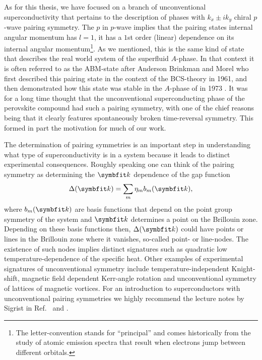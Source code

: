 As for this thesis, we have focused on a branch of unconventional superconductivity that pertains to the description of phases with
$k_x\pm ik_y$ chiral $p$-wave pairing symmetry. The $p$ in $p$-wave implies that the pairing states internal angular momentum has $l=1$, \ie it has a $1$st order (linear) dependence
on its internal angular momentum\footnote{The letter-convention stands for ``principal'' and comes historically from the study of atomic emission spectra 
that result when electrons jump between different orbitals.}. As we mentioned, this is the same kind of state that describes the real world system of the
 superfluid $A$-phase. In that context it is often referred to as the ABM-state after Anderson Brinkman and Morel who first described this pairing
state in the context of the BCS-theory \cite{Anderson61} in 1961, and then demonstrated how this state was stable in the $A$-phase
of  in 1973 \cite{Anderson73}. It was for a long time thought that the unconventional superconducting phase of the perovskite compound 
had such a pairing symmetry, with one of the chief reasons being that it clearly features spontaneously broken time-reversal symmetry. This
formed in part the motivation for much of our work.

The determination of pairing symmetries is an important step in understanding what type of superconductivity is in a system because it leads to distinct
experimental consequences. Roughly speaking one can think of the pairing symmetry as determining the $\v{k}$ dependence of the gap function
\begin{equation}
    \label{eq:Intro:GapFunc}
    \Delta(\v{k}) = \sum_{m}\eta_mb_m(\v{k}),
\end{equation}
where $b_m(\v{k})$ are basis functions that depend on the point group symmetry of the system and $\v{k}$ determines a point on the Brillouin zone. Depending
on these basis functions then, $\Delta(\v{k})$ could have points or lines in the Brillouin zone where it vanishes, so-called point- or line-nodes. The 
existence of such nodes implies distinct signatures such as quadratic low temperature-dependence of the specific heat. Other examples of experimental signatures
of unconventional symmetry include
temperature-independent Knight-shift, magnetic field dependent Kerr-angle rotation and unconventional symmetry of lattices of magnetic vortices. For an introduction to superconductors with
unconventional pairing symmetries we highly recommend the lecture notes by Sigrist in Ref.~\cite{Sigrist05} and \cite{Sigrist09}.

